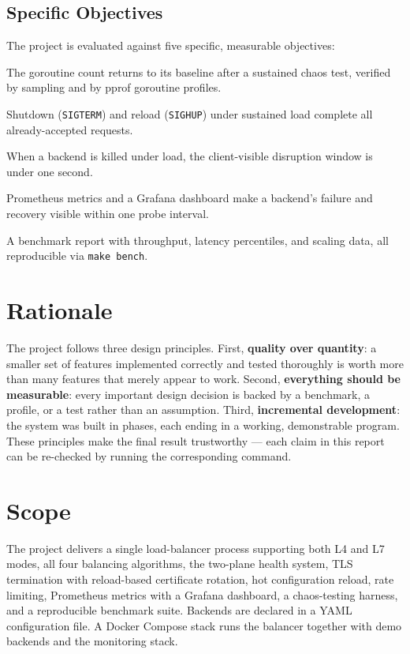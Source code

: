 \documentclass[11pt,a4paper]{report}
\newcommand{\code}[1]{\texttt{#1}}
\begin{document}
\subsection{Specific Objectives}
The project is evaluated against five specific, measurable objectives:
\begin{description}[style=nextline,leftmargin=1.2cm]
  \item[G1 --- Correct concurrency (no leaks)] The goroutine count returns to its baseline
  after a sustained chaos test, verified by sampling and by pprof goroutine profiles.
  \item[G2 --- Zero dropped in-flight requests] Shutdown (\code{SIGTERM}) and reload
  (\code{SIGHUP}) under sustained load complete all already-accepted requests.
  \item[G3 --- Fast failover] When a backend is killed under load, the client-visible
  disruption window is under one second.
  \item[G4 --- Observability] Prometheus metrics and a Grafana dashboard make a backend's
  failure and recovery visible within one probe interval.
  \item[G5 --- Reproducible performance characterization] A benchmark report with throughput,
  latency percentiles, and scaling data, all reproducible via \code{make bench}.
\end{description}

\section{Rationale}
The project follows three design principles. First, \textbf{quality over quantity}: a smaller
set of features implemented correctly and tested thoroughly is worth more than many features
that merely appear to work. Second, \textbf{everything should be measurable}: every important
design decision is backed by a benchmark, a profile, or a test rather than an assumption.
Third, \textbf{incremental development}: the system was built in phases, each ending in a
working, demonstrable program. These principles make the final result trustworthy --- each
claim in this report can be re-checked by running the corresponding command.

\section{Scope}
The project delivers a single load-balancer process supporting both L4 and L7 modes, all four
balancing algorithms, the two-plane health system, TLS termination with reload-based
certificate rotation, hot configuration reload, rate limiting, Prometheus metrics with a
Grafana dashboard, a chaos-testing harness, and a reproducible benchmark suite. Backends are
declared in a YAML configuration file. A Docker Compose stack runs the balancer together with
demo backends and the monitoring stack.
\end{document}
